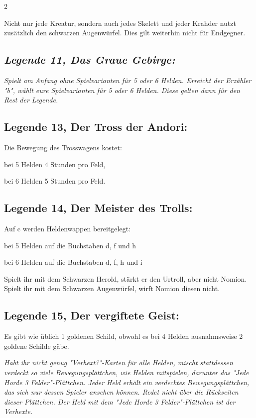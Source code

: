 \documentclass[10pt, a4paper, oneside]{book}
\newcommand{\fan}[1]{\textit{#1}}
\begin{document}
\begin{multicols*}{2}
\begin{bgcolor}
Nicht nur jede Kreatur, sondern auch jedes Skelett und jeder Krahder nutzt zusätzlich den schwarzen Augenwürfel.
\supercite{DH17:a0_5-6}
Dies gilt weiterhin nicht für Endgegner.






\subsection{\fan{Legende 11, Das Graue Gebirge:}}

\fan{Spielt am Anfang ohne Spielvarianten für 5 oder 6 Helden. Erreicht der Erzähler "b", wählt eure Spielvarianten für 5 oder 6 Helden. Diese gelten dann für den Rest der Legende.}


\subsection{Legende 13, Der Tross der Andori:}

Die Bewegung des Trosswagens kostet:
\supercite{DH13:e_5-6,MH:DlH_5-6}

\bullet{} bei 5 Helden 4 Stunden pro Feld,

\bullet{} bei 6 Helden 5 Stunden pro Feld.



\subsection{Legende 14, Der Meister des Trolls:}

Auf c werden Heldenwappen bereitgelegt:
\supercite{DH14:c_5-6,MH:DlH_5-6}

\bullet{} bei 5 Helden auf die Buchstaben d, f und h

\bullet{} bei 6 Helden auf die Buchstaben d, f, h und i


Spielt ihr mit dem Schwarzen Herold, stärkt er den Urtroll, aber nicht Nomion.
\supercite{DH:Begleitheft}
Spielt ihr mit dem Schwarzen Augenwürfel, wirft Nomion diesen nicht.
\supercite{DH14:Der_einsame_Turm_2}


\subsection{Legende 15, Der vergiftete Geist:}

Es gibt wie üblich 1 goldenen Schild, obwohl es bei 4 Helden ausnahmsweise 2 goldene Schilde gäbe.
\supercite{DlH15:a4_5-6,MH:DlH_5-6}

\fan{Habt ihr nicht genug "Verhext?"-Karten für alle Helden, mischt stattdessen verdeckt so viele Bewegungsplättchen, wie Helden mitspielen, darunter das "Jede Horde 3 Felder"-Plättchen. Jeder Held erhält ein verdecktes Bewegungsplättchen, das sich nur dessen Spieler ansehen können. Redet nicht über die Rückseiten dieser Plättchen. Der Held mit dem "Jede Horde 3 Felder"-Plättchen ist der Verhexte.}


\end{bgcolor}
\end{multicols*}
\end{document}

